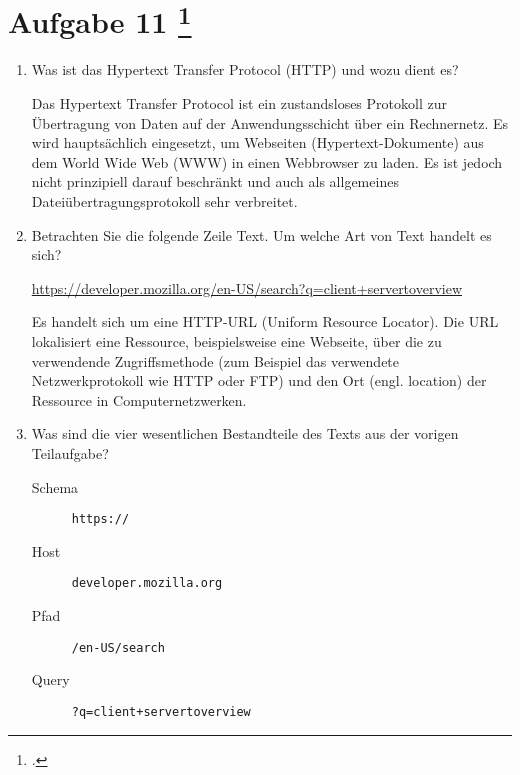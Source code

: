 \documentclass{lehramt-informatik-aufgabe}
\begin{document}
\section{Aufgabe 11
\footcite{examen:66116:2021:03}}

\begin{enumerate}

\item Was ist das Hypertext Transfer Protocol (HTTP) und wozu dient es?

\begin{liAntwort}
Das Hypertext Transfer Protocol ist ein zustandsloses Protokoll zur
Übertragung von Daten auf der Anwendungsschicht über ein Rechnernetz. Es
wird hauptsächlich eingesetzt, um Webseiten (Hypertext-Dokumente) aus
dem World Wide Web (WWW) in einen Webbrowser zu laden. Es ist jedoch
nicht prinzipiell darauf beschränkt und auch als allgemeines
Dateiübertragungsprotokoll sehr verbreitet.
\end{liAntwort}


\item Betrachten Sie die folgende Zeile Text. Um welche Art von Text
handelt es sich?

\url{https://developer.mozilla.org/en-US/search?q=client+servertoverview}

\begin{liAntwort}
Es handelt sich um eine HTTP-URL (Uniform Resource Locator). Die URL
lokalisiert eine Ressource, beispielsweise eine Webseite, über die zu
verwendende Zugriffsmethode (zum Beispiel das verwendete
Netzwerkprotokoll wie HTTP oder FTP) und den Ort (engl. location) der
Ressource in Computernetzwerken.
\end{liAntwort}


\item Was sind die vier wesentlichen Bestandteile des Texts aus der
vorigen Teilaufgabe?

\begin{liAntwort}
\begin{description}
\item[Schema] \texttt{https://}
\item[Host] \texttt{developer.mozilla.org}
\item[Pfad] \texttt{/en-US/search}
\item[Query] \texttt{?q=client+servertoverview}
\end{description}
\end{liAntwort}

\end{enumerate}
\end{document}
